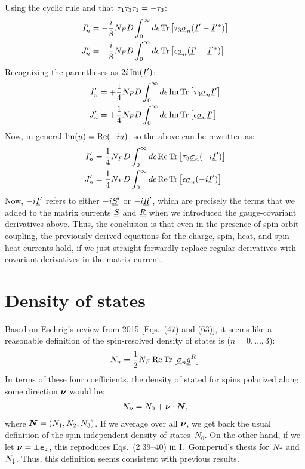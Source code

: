Using the cyclic rule and that $\tau_{1}\tau_{3}\tau_{1} = -\tau_{3}$:
\begin{align}
  I_n' &= -\frac{i}{8}N_F D \int_{0}^{\infty} d\epsilon \operatorname{Tr}\big[ \tau_{3} \underline{\sigma}_{n} (\underline{I}' - \underline{I}'{}^*) \big]\\
  J_n' &= -\frac{i}{8}N_F D \int_{0}^{\infty} d\epsilon \operatorname{Tr}\big[ \epsilon \underline{\sigma}_{n} (\underline{I}' - \underline{I}'{}^*) \big]
\end{align}
Recognizing the parentheses as $2i\operatorname{Im}(\underline{I}')$:
\begin{align}
  I_n' &= +\frac{1}{4}N_F D \int_{0}^{\infty} d\epsilon \operatorname{Im}\operatorname{Tr}\big[ \tau_{3} \underline{\sigma}_{n} \underline{I}' \big]\\
  J_n' &= +\frac{1}{4}N_F D \int_{0}^{\infty} d\epsilon \operatorname{Im}\operatorname{Tr}\big[ \epsilon \underline{\sigma}_{n} \underline{I}' \big]
\end{align}
Now, in general $\operatorname{Im}(u) = \operatorname{Re}(-iu)$, so the above can be rewritten as:
\begin{align}
  I_n' &= \frac{1}{4}N_F D \int_{0}^{\infty} d\epsilon \operatorname{Re}\operatorname{Tr}\big[ \tau_{3} \underline{\sigma}_{n} (-i\underline{I}') \big]\\
  J_n' &= \frac{1}{4}N_F D \int_{0}^{\infty} d\epsilon \operatorname{Re}\operatorname{Tr}\big[ \epsilon \underline{\sigma}_{n} (-i\underline{I}') \big]
\end{align}
Now, $-i\underline{I}'$ refers to either $-i\underline{S}'$ or $-i\underline{R}'$, which are precisely the terms that we added to the matrix currents $\underline{S}$ and $\underline{R}$ when we introduced the gauge-covariant derivatives above.
Thus, the conclusion is that even in the presence of spin-orbit coupling, the previously derived equations for the charge, spin, heat, and spin-heat currents hold, if we just straight-forwardly replace regular derivatives with covariant derivatives in the matrix current.





\clearpage
\section{Density of states}
Based on Eschrig's review from 2015 [Eqs.~(47) and (63)], it seems like a reasonable definition of the spin-resolved density of states is ($n=0,\ldots,3$):
\begin{align}
  N_n = \frac{1}{2}N_F \operatorname{Re}\operatorname{Tr}\big[\underline{\sigma}_{n} \underline{g}^R\big]
\end{align}
In terms of these four coefficients, the density of stated for spins polarized along some direction $\bm{\nu}$ would be:
\begin{align}
  N_{\bm{\nu}}  = N_0 + \bm{\nu} \cdot \bm{N},
\end{align}
where $\bm{N} = (N_1, N_2, N_3)$.
If we average over all $\bm{\nu}$, we get back the usual definition of the spin-independent density of states~$N_0$.
On the other hand, if we let $\bm{\nu} = \pm\bm{e}_z$, this reproduces Eqs.~(2.39--40) in I.~Gomperud's thesis for $N_\uparrow$ and $N_\downarrow$.
Thus, this definition seems consistent with previous results.

